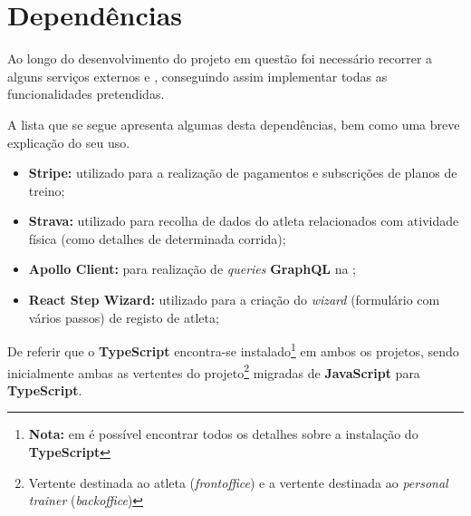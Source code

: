 \section{Dependências}

Ao longo do desenvolvimento do projeto em questão foi necessário recorrer a alguns serviços externos e , conseguindo assim implementar todas as funcionalidades pretendidas.

A lista que se segue apresenta algumas desta dependências, bem como uma breve explicação do seu uso.

\begin{itemize}
	\item \textbf{Stripe:} utilizado para a realização de pagamentos e subscrições de planos de treino;
	\item \textbf{Strava:} utilizado para recolha de dados do atleta relacionados com atividade física (como detalhes de determinada corrida);
	\item \textbf{Apollo Client:} para realização de \textit{queries} \textbf{GraphQL} na ;
	\item \textbf{React Step Wizard:} utilizado para a criação do \textit{wizard} (formulário com vários passos) de registo de atleta;
\end{itemize}

De referir que o \textbf{TypeScript} encontra-se instalado\footnote{\textbf{Nota:} em  é possível encontrar todos os detalhes sobre a instalação do \textbf{TypeScript}} em ambos os projetos, sendo inicialmente ambas as vertentes do projeto\footnote{Vertente destinada ao atleta (\textit{frontoffice}) e a vertente destinada ao \textit{personal trainer} (\textit{backoffice})} migradas de \textbf{JavaScript} para \textbf{TypeScript}.